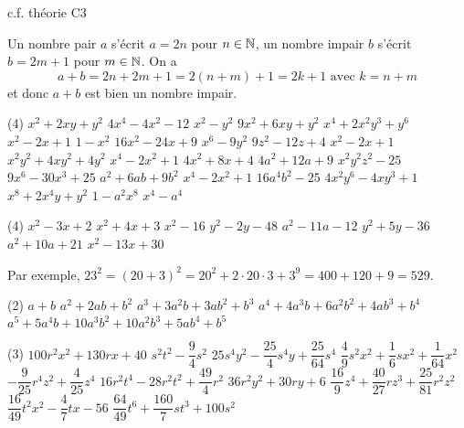\documentclass[a4paper,12pt]{report}
\begin{document}
\vspace*{-2\baselineskip}
\begin{core}
c.f. théorie C3
\end{core}
\begin{core}
Un nombre pair $a$ s'écrit $a=2n$ pour $n\in \mathbb N$, un nombre impair $b$ s'écrit $b=2m+1$ pour $m\in \mathbb N$. On a 
\[a+b=2n+2m+1=2(n+m)+1=2k+1 \text{ avec } k=n+m\]
et donc $a+b$ est bien un nombre impair.
\end{core}
\begin{core}
	\phantom{ }
	\begin{tasks}(4)
\task $x^2 + 2xy + y^2$
\task $4x^4 - 4x^2 - 12$
\task $x^2 - y^2$
\task $9x^2 + 6xy + y^2$
\task $x^4 + 2x^2y^3 + y^6$
\task $x^2 - 2x + 1$
\task $1 - x^2$
\task $16x^2 - 24x + 9$
\task $x^6 - 9y^2$
\task $9z^2 - 12z + 4$
\task $x^2 - 2x +1$
\task $x^2y^2 + 4xy^2 + 4y^2$
\task $x^4 - 2x^2 + 1$
\task $4x^2 + 8x + 4$
\task $4a^2 + 12a + 9$
\task $x^2y^2z^2 - 25$
\task $9x^6 - 30x^3 + 25$
\task $a^2 + 6ab + 9b^2$
\task $x^4 - 2x^2 + 1$
\task $16a^4b^2 - 25$
\task $4x^2y^6 - 4xy^3 + 1$
\task $x^8 + 2x^4y + y^2$
\task $1 - a^2x^8$
\task $x^4 - a^4$
	\end{tasks}
\end{core}

\begin{core}
	\phantom{ }
	\begin{tasks}(4)
\task $ x^2 - 3x + 2$
\task $ x^2 + 4x + 3$
\task $ x^2 - 16$
\task $ y^2 - 2y - 48$
\task $ a^2 - 11a - 12$
\task $ y^2 + 5y - 36$
\task $ a^2 + 10a + 21$
\task $ x^2 - 13x + 30$
\end{tasks}
\end{core}

\begin{core}
	Par exemple, $23^2=(20+3)^2=20^2+2\cdot 20\cdot 3+3^9=400+120+9=529$.
\end{core}
\begin{core}
	\phantom{ }
	\begin{tasks}(2)
\task $a + b$
\task $a^2 + 2ab + b^2$
\task $a^3 + 3a^2b + 3ab^2 + b^3$
\task $a^4 + 4a^3b + 6a^2b^2 + 4ab^3 + b^4$
\task $a^5 + 5a^4b + 10a^3b^2 + 10a^2b^3 + 5ab^4 + b^5$
	\end{tasks}
\end{core}
\begin{core}\phantom{ }

\begin{tasks}(3)
\task $100 r^2 x^2 + 130 r x + 40 $
\task $s^2 t^2-\dfrac{9}{4} s^2$
\task $25 s^4 y^2-\dfrac{25}{4} s^4 y + \dfrac{25}{64} s^4$
\task $\dfrac{4}{9} s^2 x^2 + \dfrac{1}{6} s x^2 + \dfrac{1}{64} x^2$
\task $-\dfrac{9}{25} r^4 z^2 + \dfrac{4}{25} z^4$
\task $16 r^2 t^4-28 r^2 t^2 + \dfrac{49}{4} r^2$
\task $36 r^2 y^2 + 30 r y + 6 $
\task $\dfrac{16}{9} z^4 + \dfrac{40}{27} r z^3 + \dfrac{25}{81} r^2 z^2$
\task $\dfrac{16}{49} t^2 x^2-\dfrac{4}{7} t x-56 $
\task $\dfrac{64}{49} t^6 + \dfrac{160}{7} s t^3 + 100 s^2$
\end{tasks}

\end{core}
\end{document}
